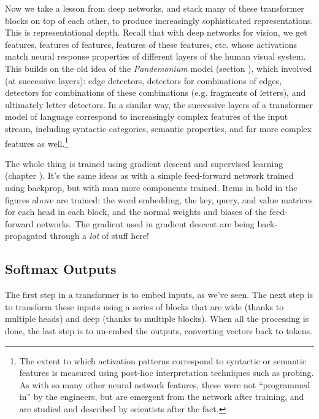 Now we take a lesson from deep networks, and stack many of these transformer blocks on top of each other, to produce increasingly sophisticated representations. This is representational depth. Recall that with deep networks for vision, we get features, features of features, features of these features, etc. whose activations match neural response properties of different layers of the human visual system. This builds on the old idea of the \emph{Pandemonium} model (section ), which involved (at successive layers): edge detectors, detectors for combinations of edges, detectors for combinations of these combinations (e.g. fragments of letters), and ultimately letter detectors. In a similar way, the successive layers of a transformer model of language correspond to increasingly complex features of the input stream, including syntactic categories, semantic properties, and far more complex features as well.\footnote{The extent to which activation patterns correspond to syntactic or semantic features is measured using post-hoc interpretation techniques such as probing. As with so many other neural network features, these were not ``programmed in'' by the engineers, but are emergent from the network after training, and are studied and described by scientists after the fact.}

The whole thing is trained using gradient descent and supervised learning (chapter ). It's the same ideas as with a simple feed-forward network trained using backprop, but with man more components trained. Items in bold in the figures above are trained: the word embedding, the key, query, and value matrices for each head in each block, and the normal weights and biases of the feed-forward networks. The gradient used in gradient descent are being back-propagated through a \emph{lot} of stuff here!

\subsection{Softmax Outputs}\label{llmOutput}

The first step in a transformer is to embed inputs, as we've seen. The next step is to transform these inputs using a series of blocks that are wide (thanks to multiple heads) and deep (thanks to multiple blocks). When all the processing is done, the last step is to un-embed the outputs, converting vectors back to tokens. 

